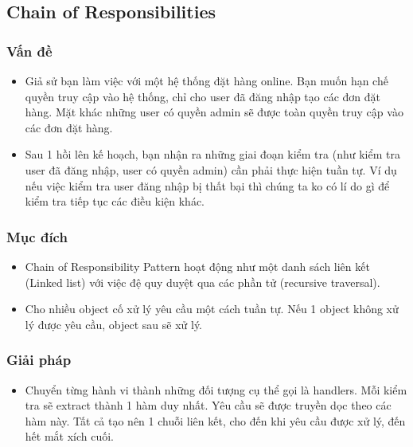\thispagestyle{empty}
\subsection{Chain of Responsibilities}
\subsubsection{Vấn đề}
\begin{flushleft}
	\begin{itemize}
		\item Giả sử bạn làm việc với một hệ thống đặt hàng online. Bạn muốn hạn chế quyền truy cập vào hệ thống, chỉ cho user đã đăng nhập tạo các đơn đặt hàng. Mặt khác những user có quyền admin sẽ được toàn quyền truy cập vào các đơn đặt hàng.
		\item Sau 1 hồi lên kế hoạch, bạn nhận ra những giai đoạn kiểm tra (như kiểm tra user đã đăng nhập, user có quyền admin) cần phải thực hiện tuần tự. Ví dụ nếu việc kiểm tra user đăng nhập bị thất bại thì chúng ta ko có lí do gì để kiểm tra tiếp tục các điều kiện khác.
	\end{itemize}

\end{flushleft}

\subsubsection{Mục đích}
\begin{flushleft}
	\begin{itemize}
		\item Chain of Responsibility Pattern hoạt động như một danh sách liên kết (Linked list) với việc đệ quy duyệt qua các phần tử (recursive traversal).
		\item Cho nhiều object cố xử lý yêu cầu một cách tuần tự. Nếu 1 object không xử lý được yêu cầu, object sau sẽ xử lý.
	\end{itemize}

\end{flushleft}

\subsubsection{Giải pháp}
\begin{flushleft}
\begin{itemize}
		\item
Chuyển từng hành vi thành những đối tượng cụ thể gọi là handlers. Mỗi kiểm tra sẽ extract thành 1 hàm duy nhất. Yêu cầu sẽ được truyền dọc theo các hàm này. Tất cả tạo nên 1 chuỗi liên kết, cho đến khi yêu cầu được xử lý, đến hết mắt xích cuối.
\end{itemize}

\end{flushleft}

